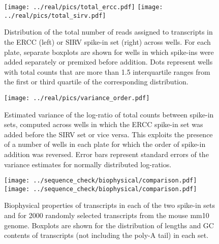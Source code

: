 \documentclass{article}
\begin{document}
\begin{figure}[btp]
    \begin{center}
        \texttt{[image: ../real/pics/total\_ercc.pdf]}
        \texttt{[image: ../real/pics/total\_sirv.pdf]}
    \end{center}
    \caption{Distribution of the total number of reads assigned to transcripts in the ERCC (left) or SIRV spike-in set (right) across wells.
        For each plate, separate boxplots are shown for wells in which spike-ins were added separately or premixed before addition.
        Dots represent wells with total counts that are more than 1.5 interquartile ranges from the first or third quartile of the corresponding distribution.
    }
    \label{fig:totals}
\end{figure}

\begin{figure}[btp]
    \begin{center}
        \texttt{[image: ../real/pics/variance\_order.pdf]}
    \end{center}
    \caption{Estimated variance of the log-ratio of total counts between spike-in sets, computed across wells in which the ERCC spike-in set was added before the SIRV set or vice versa.
        This exploits the presence of a number of wells in each plate for which the order of spike-in addition was reversed.
        Error bars represent standard errors of the variance estimates for normally distributed log-ratios.
    }
\end{figure}

\begin{figure}[btp]
    \begin{center}
        \texttt{[image: ../sequence\_check/biophysical/comparison.pdf]}
        \texttt{[image: ../sequence\_check/biophysical/comparison.pdf]}
    \end{center}
    \caption{Biophysical properties of transcripts in each of the two spike-in sets and for 2000 randomly selected transcripts from the mouse mm10 genome.
    Boxplots are shown for the distribution of lengths and GC contents of transcripts (not including the poly-A tail) in each set.
}
\end{figure}
\end{document}
